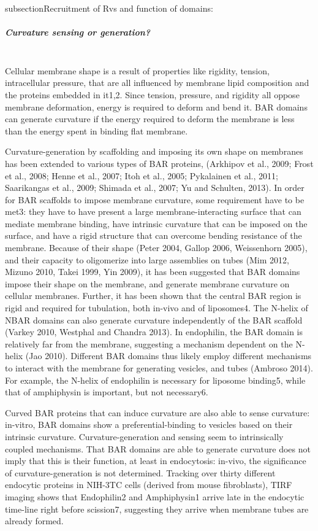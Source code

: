 subsection{Recruitment of Rvs and function of domains: } 

	\subparagraph{Curvature sensing or generation? }
	\mbox{}\\
Cellular membrane shape is a result of properties like rigidity, tension, intracellular pressure, that are all influenced by membrane lipid composition and the proteins embedded in it1,2. Since tension, pressure, and rigidity all oppose membrane deformation, energy is required to deform and bend it. BAR domains can generate curvature if the energy required to deform the membrane is less than the energy spent in binding flat membrane.

\vspace{5mm}
			
Curvature-generation by scaffolding and imposing its own shape on membranes has been extended to various types of BAR proteins, (Arkhipov et al., 2009; Frost et al., 2008; Henne et al., 2007; Itoh et al., 2005; Pykalainen et al., 2011; Saarikangas et al., 2009; Shimada et al., 2007; Yu and Schulten, 2013). In order for BAR scaffolds to impose membrane curvature, some requirement have to be met3: they have to have present a large membrane-interacting surface that can mediate membrane binding, have intrinsic curvature that can be imposed on the surface, and have a rigid structure that can overcome bending resistance of the membrane. Because of their shape (Peter 2004, Gallop 2006, Weissenhorn 2005), and their capacity to oligomerize into large assemblies on tubes (Mim 2012, Mizuno 2010, Takei 1999, Yin 2009), it has been suggested that BAR domains impose their shape on the membrane, and generate membrane curvature on cellular membranes. Further, it has been shown that the central BAR region is rigid and required for tubulation, both in-vivo and of liposomes4. The N-helix of NBAR domains can also generate curvature independently of the BAR scaffold (Varkey 2010, Westphal and Chandra 2013). In endophilin, the BAR domain is relatively far from the membrane, suggesting a mechanism dependent on the N-helix (Jao 2010). Different BAR domains thus likely employ different mechanisms to interact with the membrane for generating vesicles, and tubes (Ambroso 2014). For example, the N-helix of endophilin is necessary for liposome binding5, while that of amphiphysin is important, but not necessary6. 


\vspace{5mm}
Curved BAR proteins that can induce curvature are also able to sense curvature: in-vitro, BAR domains show a preferential-binding to vesicles based on their intrinsic curvature. Curvature-generation and sensing seem to intrinsically coupled mechanisms. That BAR domains are able to generate curvature does not imply that this is their function, at least in endocytosis: in-vivo, the significance of curvature-generation is not determined. Tracking over thirty different endocytic proteins in NIH-3TC cells (derived from mouse fibroblasts), TIRF imaging shows that Endophilin2 and Amphiphysin1 arrive late in the endocytic time-line right before scission7, suggesting they arrive when membrane tubes are already formed. 


